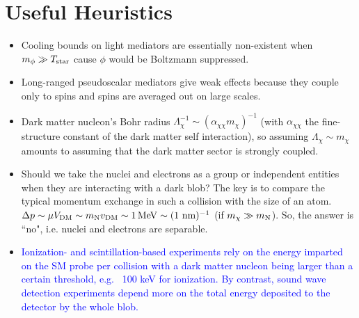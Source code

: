 \documentclass[%
 reprint,
 amsmath,amssymb,
 aps,nofootinbib
]{revtex4-1}
\newcommand{\MeV}{\mathinner{\mathrm{MeV}}}
\begin{document}
\section{Useful Heuristics}
\begin{itemize}
    \item Cooling bounds on light mediators are essentially non-existent when $m_\phi\gg T_{\rm star}$ cause $\phi$ would be Boltzmann suppressed. 
    \item Long-ranged pseudoscalar mediators give weak effects because they couple only to spins and spins are averaged out on large scales.
    \item Dark matter nucleon's Bohr radius $\Lambda_\chi^{-1}\sim (\alpha_{\chi\chi}m_\chi)^{-1}$ (with $\alpha_{\chi\chi}$ the fine-structure constant of the dark matter self interaction), so assuming $\Lambda_\chi\sim m_\chi$ amounts to assuming that the dark matter sector is strongly coupled.
    \item Should we take the nuclei and electrons as a group or independent entities when they are interacting with a dark blob? The key is to compare the typical momentum exchange in such a collision with the size of an atom. $\Delta p\sim \mu V_{\rm DM}\sim m_{\rm N}v_{\rm DM}\sim 1\MeV\sim (1\text{ nm})^{-1}$ (if $m_\chi\gg m_{\rm N}$). So, the answer is ``no", i.e. nuclei and electrons are separable.
    \item \textcolor{blue}{Ionization- and scintillation-based experiments rely on the energy imparted on the SM probe per collision with a dark matter nucleon being larger than a certain threshold, e.g. ~100 keV for ionization. By contrast, sound wave detection experiments depend more on the total energy deposited to the detector by the whole blob.}

\end{itemize}
\end{document}
